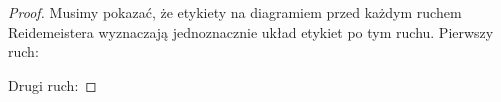 \begin{proof}
    Musimy pokazać, że etykiety na diagramiem przed każdym ruchem Reidemeistera wyznaczają jednoznacznie układ etykiet po tym ruchu.
    Pierwszy ruch:
\begin{comment}
    \[
        \begin{tikzpicture}[baseline=-0.65ex,scale=0.07]
        \begin{knot}[clip width=5,flip crossing/.list={1}]
            \strand[semithick,Latex-] (15, 0) [in=up,out=left] to (-5, -7);
            \strand[semithick] (-5, -7) [in=down,out=down] to (5, -7);
            \strand[semithick] (5, -7) [in=right,out=up] to (-15, 0);
            \node[darkblue] at (-15, 0)[left] {$x$};
            \node[darkblue] at (15, 0)[right] {$x \triangleright x$};
        \end{knot}
        \end{tikzpicture}
        \stackrel{R_1}{\cong} \,\,
        \begin{tikzpicture}[baseline=-0.65ex,scale=0.07]
        \begin{knot}[clip width=5]
            \strand[semithick,-Latex] (-15, 0) to (15, 0);
            \node[darkblue] at (-15, 0)[left] {$x$};
        \end{knot}
        \end{tikzpicture}
    \]
\end{comment}
    Drugi ruch:
\begin{comment}
    \[
        \begin{tikzpicture}[baseline=-0.65ex,scale=0.07]
        \begin{knot}[clip width=4, flip crossing/.list={1,2}]
            \strand[semithick,-Latex] (-10, -4) to (-7, -4) [in=left, out=right] to (0, 4) [in=left, out=right] to (7, -4) to (10, -4) to (15, -4);
            \strand[semithick] (-10, 4) to (-7, 4) [in=left, out=right] to (0, -4) [in=left, out=right] to (7, 4) to (10, 4) to (15, 4);
            \node[darkblue] at (-10, -4)[left] {$y$};
            \node[darkblue] at (-10, 4)[left] {$x$};
            \node[darkblue] at (0, 4) [above] {$y \triangleright x$};
            \node[darkblue] at (15, -4) [right] {$x \triangleleft (y \triangleright x)$};
        \end{knot}
        \end{tikzpicture}
        \stackrel{R_2}{\cong} \,\,
        \begin{tikzpicture}[baseline=-0.65ex,scale=0.07]
        \begin{knot}[clip width=4]
            \strand[semithick,-Latex] (-10, -4) to (-7, -4) [in=left, out=right] to (0, -1) [in=left, out=right] to (7, -4) to (10, -4) to (15, -4);

\end{comment}
\end{proof}
